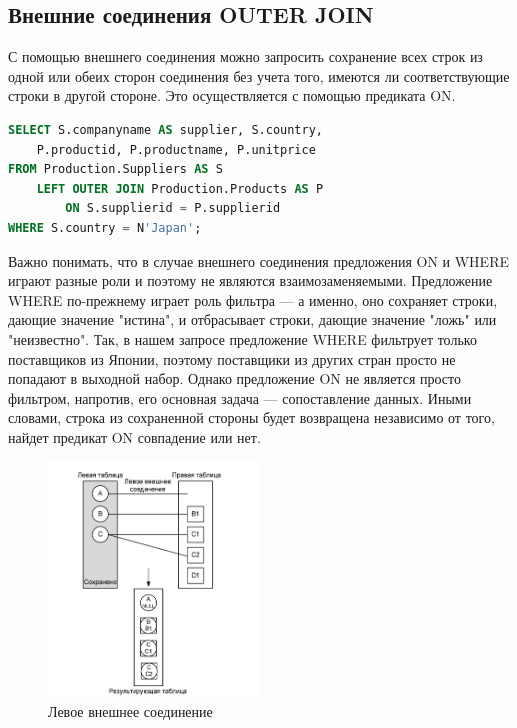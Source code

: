 \subsection{Внешние соединения OUTER JOIN}
С помощью внешнего соединения можно запросить сохранение всех строк из одной или обеих сторон соединения без учета того, имеются ли соответствующие строки в другой стороне. Это осуществляется с помощью предиката ON.

\begin{lstlisting}[label=lst:funcReturn, caption=Пример LEFT JOIN, language=sql]
SELECT S.companyname AS supplier, S.country,
	P.productid, P.productname, P.unitprice
FROM Production.Suppliers AS S
	LEFT OUTER JOIN Production.Products AS P
		ON S.supplierid = P.supplierid
WHERE S.country = N'Japan'; 
\end{lstlisting}

Важно понимать, что в случае внешнего соединения предложения ON и WHERE играют разные роли и поэтому не являются взаимозаменяемыми. Предложение WHERE
по-прежнему играет роль фильтра — а именно, оно сохраняет строки, дающие значение "истина", и отбрасывает строки, дающие значение "ложь" или "неизвестно".
Так, в нашем запросе предложение WHERE фильтрует только поставщиков из Японии, поэтому поставщики из других стран просто не попадают в выходной набор.
Однако предложение ON не является просто фильтром, напротив, его основная задача — сопоставление данных. Иными словами, строка из сохраненной стороны будет возвращена независимо от того, найдет предикат ON совпадение или нет.
\newpage

\begin{figure}[h!]
	\begin{center}
		\includegraphics[width=0.5\textwidth]{img/left.png}
	\end{center}
	\captionsetup{justification=centering}
	\caption{Левое внешнее соединение}
\end{figure}

